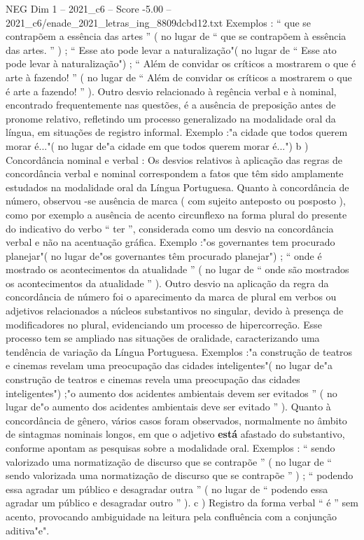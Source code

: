 \begin{textsample}{NEG Dim 1 – 2021\_c6 – Score -5.00 – 2021\_c6/enade\_2021\_letras\_ing\_8809dcbd12.txt}
Exemplos : “ que se contrapõem a essência das artes ” ( no lugar de “ que se contrapõem à essência das artes. ” ) ; “ Esse ato pode levar a naturalização"( no lugar de “ Esse ato pode levar à naturalização") ; “ Além de convidar os críticos a mostrarem o que é arte à fazendo! ” ( no lugar de “ Além de convidar os críticos a mostrarem o que é arte a fazendo! ” ).
Outro desvio relacionado à regência verbal e à nominal, encontrado frequentemente nas questões, é a ausência de preposição antes de pronome relativo, refletindo um processo generalizado na modalidade oral da língua, em situações de registro informal.
Exemplo :"a cidade que todos querem morar é..."( no lugar de"a cidade em que todos querem morar é...") b ) Concordância nominal e verbal : Os desvios relativos à aplicação das regras de concordância verbal e nominal correspondem a fatos que têm sido amplamente estudados na modalidade oral da Língua Portuguesa.
Quanto à concordância de número, observou -se ausência de marca ( com sujeito anteposto ou posposto ), como por exemplo a ausência de acento circunflexo na forma plural do presente do indicativo do verbo “ ter ”, considerada como um desvio na concordância verbal e não na acentuação gráfica.
Exemplo :"os governantes tem procurado planejar"( no lugar de"os governantes têm procurado planejar") ; “ onde é mostrado os acontecimentos da atualidade ” ( no lugar de “ onde são mostrados os acontecimentos da atualidade ” ).
Outro desvio na aplicação da regra da concordância de número foi o aparecimento da marca de plural em verbos ou adjetivos relacionados a núcleos substantivos no singular, devido à presença de modificadores no plural, evidenciando um processo de hipercorreção.
Esse processo tem se ampliado nas situações de oralidade, caracterizando uma tendência de variação da Língua Portuguesa.
Exemplos :"a construção de teatros e cinemas revelam uma preocupação das cidades inteligentes"( no lugar de"a construção de teatros e cinemas revela uma preocupação das cidades inteligentes") ;"o aumento dos acidentes ambientais devem ser evitados ” ( no lugar de"o aumento dos acidentes ambientais deve ser evitado ” ).
Quanto à concordância de gênero, vários casos foram observados, normalmente no âmbito de sintagmas nominais longos, em que o adjetivo \textbf{está} afastado do substantivo, conforme apontam as pesquisas sobre a modalidade oral.
Exemplos : “ sendo valorizado uma normatização de discurso que se contrapõe ” ( no lugar de “ sendo valorizada uma normatização de discurso que se contrapõe ” ) ; “ podendo essa agradar um público e desagradar outra ” ( no lugar de “ podendo essa agradar um público e desagradar outro ” ). c ) Registro da forma verbal “ é ” sem acento, provocando ambiguidade na leitura pela confluência com a conjunção aditiva"e".

\end{textsample}
